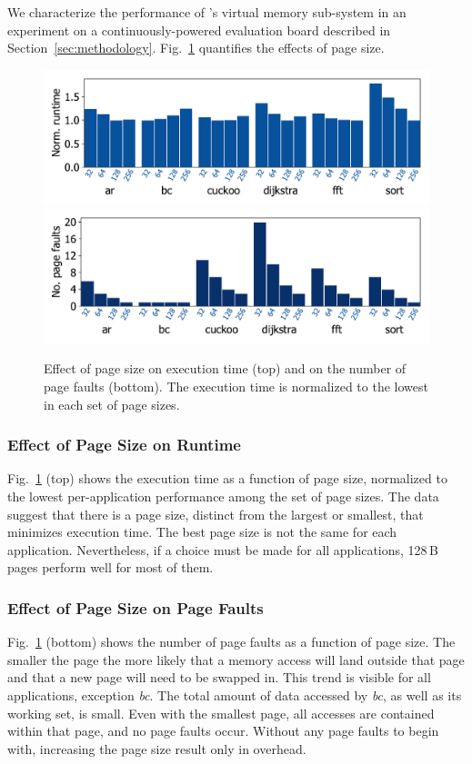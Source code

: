 We characterize the performance of \sys's virtual memory sub-system in an
experiment on a continuously-powered evaluation board described in
Section~\ref{sec:methodology}. Fig.~\ref{fig:page_size} quantifies the
effects of page size.
%
\begin{figure}
	\centering
	\includegraphics[width=\columnwidth]{figures/page_exec-time}
	\includegraphics[width=\columnwidth]{figures/pagePulls}
    \caption{Effect of page size on execution time (top) and on the number of
page faults (bottom). The execution time is normalized to the lowest in each set
of page sizes.}
	\label{fig:page_size}
\end{figure}
%
\subsubsection{Effect of Page Size on Runtime}
%
Fig.~\ref{fig:page_size} (top) shows the execution time as a function
of page size, normalized to the lowest per-application performance among the
set of page sizes.
The data suggest that there is a page size, distinct from the largest or
smallest, that minimizes execution time. The best page size is not the same for
each application. Nevertheless, if a choice must be made for all applications,
128\,B pages perform well for most of them.
%
\subsubsection{Effect of Page Size on Page Faults}
%
Fig.~\ref{fig:page_size} (bottom) shows the number of page faults as a
function of page size.
%
The smaller the page the more likely that a memory access will land
outside that page and that a new page will need to be swapped in.
%
This trend is visible for all applications, exception \textit{bc}. The total
amount of data accessed by \textit{bc}, as well as its working set, is small.
Even with the smallest page, all accesses are contained within that page, and
no page faults occur. Without any page faults to begin with, increasing the
page size result only in overhead.